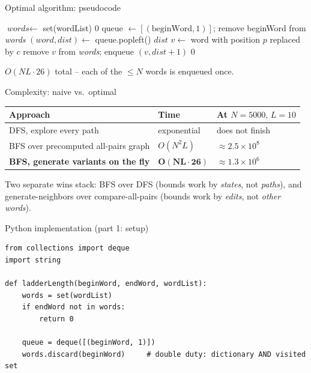\documentclass[11pt,aspectratio=169]{beamer}
\begin{document}
\begin{frame}{Optimal algorithm: pseudocode}
  \footnotesize
  \begin{algorithmic}[1]
      \State $\textit{words} \gets$ set(wordList) 
       \Return $0$ \EndIf
      \State queue $\gets [(\text{beginWord}, 1)]$; remove beginWord from \textit{words}
        \State $(word, dist) \gets$ queue.popleft()
         \Return $dist$ \EndIf
          \State $v \gets$ word with position $p$ replaced by $c$
            \State remove $v$ from \textit{words}; enqueue $(v, dist+1)$
          \EndIf
        \EndFor
      \EndWhile
      \State \Return $0$
    \EndFunction
  \end{algorithmic}
  \scriptsize $O(NL\cdot26)$ total -- each of the $\le N$ words is enqueued once.
\end{frame}

\begin{frame}{Complexity: naive vs.\ optimal}
  \begin{center}
  \begin{tabular}{@{}lll@{}}
    \toprule
    Approach & Time & At $N=5000,\,L=10$ \\
    \midrule
    DFS, explore every path & exponential & does not finish \\
    BFS over precomputed all-pairs graph & $O(N^2 L)$ & $\approx 2.5\times10^8$ \\
    \textbf{BFS, generate variants on the fly} & $\boldsymbol{O(NL\cdot26)}$ &
    $\approx 1.3\times10^6$ \\
    \bottomrule
  \end{tabular}
  \end{center}
  Two separate wins stack: BFS over DFS (bounds work by \emph{states}, not
  \emph{paths}), and generate-neighbors over compare-all-pairs (bounds work by
  \emph{edits}, not \emph{other words}).
\end{frame}

\begin{frame}[fragile]{Python implementation (part 1: setup)}
  \begin{lstlisting}[style=py]
from collections import deque
import string

def ladderLength(beginWord, endWord, wordList):
    words = set(wordList)
    if endWord not in words:
        return 0

    queue = deque([(beginWord, 1)])
    words.discard(beginWord)     # double duty: dictionary AND visited set
  \end{lstlisting}
\end{frame}
\end{document}

